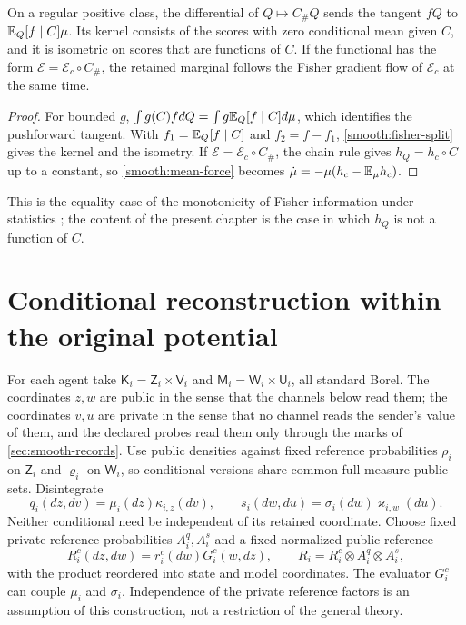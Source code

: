 On a regular positive class, the differential of $Q\mapsto C_\#Q$ sends the tangent $fQ$ to $\mathbb E_Q[f\mid C]\mu$. Its kernel consists of the scores with zero conditional mean given $C$, and it is isometric on scores that are functions of $C$. If the functional has the form $\mathcal E=\mathcal E_c\circ C_\#$, the retained marginal follows the Fisher gradient flow of $\mathcal E_c$ at the same time.
\begin{proof}
For bounded $g$, $\int g(C)f dQ=\int g\mathbb E_Q[f\mid C]d\mu$, which identifies the pushforward tangent. With $f_1=\mathbb E_Q[f\mid C]$ and $f_2=f-f_1$, \cref{smooth:fisher-split} gives the kernel and the isometry. If $\mathcal E=\mathcal E_c\circ C_\#$, the chain rule gives $h_Q=h_c\circ C$ up to a constant, so \cref{smooth:mean-force} becomes $\dot\mu=-\mu(h_c-\mathbb E_\mu h_c)$.
\end{proof}
This is the equality case of the monotonicity of Fisher information under statistics \citep{AyJostLeSchwachhofer2018}; the content of the present chapter is the case in which $h_Q$ is not a function of $C$.

\section{Conditional reconstruction within the original potential}

For each agent take $\mathsf K_i=\mathsf Z_i\times\mathsf V_i$ and $\mathsf M_i=\mathsf W_i\times\mathsf U_i$, all standard Borel. The coordinates $z,w$ are public in the sense that the channels below read them; the coordinates $v,u$ are private in the sense that no channel reads the sender's value of them, and the declared probes read them only through the marks of \cref{sec:smooth-records}. Use public densities against fixed reference probabilities $\rho_i$ on $\mathsf Z_i$ and $\varrho_i$ on $\mathsf W_i$, so conditional versions share common full-measure public sets. Disintegrate
\begin{equation}
 q_i(dz,dv)=\mu_i(dz)\kappa_{i,z}(dv),\qquad
 s_i(dw,du)=\sigma_i(dw)\varkappa_{i,w}(du).
 \label{smooth:disintegrations}
\end{equation}
Neither conditional need be independent of its retained coordinate. Choose fixed private reference probabilities $A_i^q,A_i^s$ and a fixed normalized public reference
\begin{equation}
 R_i^c(dz,dw)=r_i^c(dw)G_i^c(w,dz),\qquad
 R_i=R_i^c\otimes A_i^q\otimes A_i^s,
 \label{smooth:reference}
\end{equation}
with the product reordered into state and model coordinates. The evaluator $G_i^c$ can couple $\mu_i$ and $\sigma_i$. Independence of the private reference factors is an assumption of this construction, not a restriction of the general theory.

